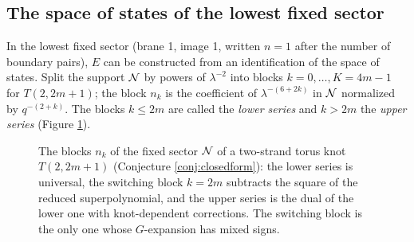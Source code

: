 \subsection{The space of states of the lowest fixed sector}\label{sec:principle}
In the lowest fixed sector (brane 1, image 1, written $n = 1$ after the number of boundary pairs), $E$ can be constructed from an identification of the space of states. Split the support $\mathcal{N}$ by powers of $\lambda^{-2}$ into blocks $k = 0, \dots, K = 4m-1$ for $T(2,2m+1)$; the block $n_k$ is the coefficient of $\lambda^{-(6+2k)}$ in $\mathcal{N}$ normalized by $q^{-(2+k)}$. The blocks $k \le 2m$ are called the \emph{lower series} and $k > 2m$ the \emph{upper series} (Figure \ref{fig:series}).

\begin{figure}[htbp]
\centering
{}
\caption{The blocks $n_k$ of the fixed sector $\mathcal{N}$ of a two-strand torus knot $T(2,2m+1)$ (Conjecture \ref{conj:closedform}): the lower series is universal, the switching block $k = 2m$ subtracts the square of the reduced superpolynomial, and the upper series is the dual of the lower one with knot-dependent corrections. The switching block is the only one whose $G$-expansion has mixed signs.}\label{fig:series}
\end{figure}

